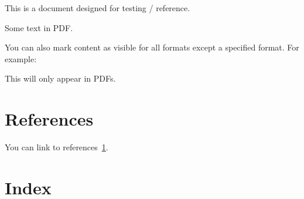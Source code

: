 \documentclass[
  letterpaper,
]{book}
\newlength{\cslhangindent}
\newenvironment{CSLReferences}[2] %
 {\begin{list}{}{%
  \setlength{\itemindent}{0pt}
  \setlength{\leftmargin}{0pt}
  \setlength{\parsep}{0pt}
  \ifodd #1
   \setlength{\leftmargin}{\cslhangindent}
   \setlength{\itemindent}{-1\cslhangindent}
  \fi
  \setlength{\itemsep}{#2\baselineskip}}}
 {\end{list}}
\begin{document}
This is a document designed for testing / reference.

Some text {in PDF.}

You can also mark content as visible for all formats except a specified
format. For example:

This will only appear in PDFs.

\chapter{References}\label{sec-test-referencekey}

You can link to references~\ref{sec-test-referencekey}.

\label{refs}
\begin{CSLReferences}{0}{1}
\end{CSLReferences}

\chapter*{Index}\label{index}


\printindex


\backmatter

\printindex
\end{document}
